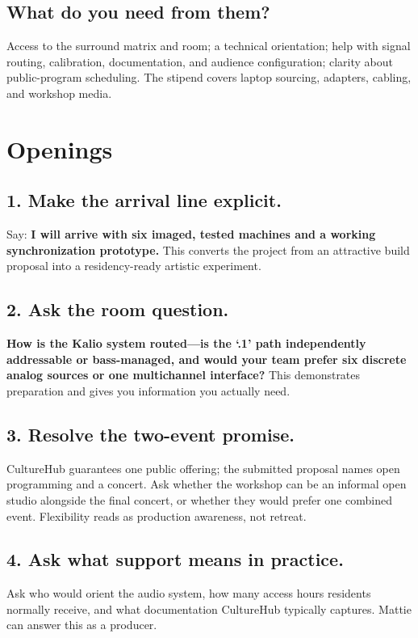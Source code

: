 \documentclass[11pt,letterpaper]{article}
\begin{document}
\subsection{What do you need from them?}
Access to the surround matrix and room; a technical orientation; help with
signal routing, calibration, documentation, and audience configuration; clarity
about public-program scheduling. The stipend covers laptop sourcing, adapters,
cabling, and workshop media.

\section{Openings}

\subsection{1. Make the arrival line explicit.}
Say: \textbf{I will arrive with six imaged, tested machines and a working
synchronization prototype.} This converts the project from an attractive build
proposal into a residency-ready artistic experiment.

\subsection{2. Ask the room question.}
\textbf{How is the Kalio system routed—is the `.1' path independently
addressable or bass-managed, and would your team prefer six discrete analog
sources or one multichannel interface?} This demonstrates preparation and gives
you information you actually need.

\subsection{3. Resolve the two-event promise.}
CultureHub guarantees one public offering; the submitted proposal names open
programming and a concert. Ask whether the workshop can be an informal open
studio alongside the final concert, or whether they would prefer one combined
event. Flexibility reads as production awareness, not retreat.

\subsection{4. Ask what support means in practice.}
Ask who would orient the audio system, how many access hours residents normally
receive, and what documentation CultureHub typically captures. Mattie can answer
this as a producer.
\end{document}

